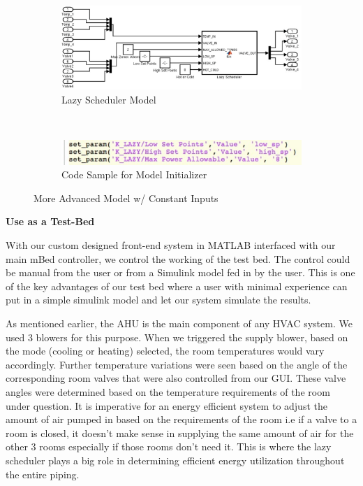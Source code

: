 \documentclass[a4paper,10pt,twocolumn]{article}
\begin{document}
\begin{figure}\centering
        \begin{subfigure}[t]{\linewidth}
                \centering
                \includegraphics[width=\linewidth]{lazy_mdl}
                \caption{Lazy Scheduler Model}
                \label{lazy_mdl}
        \end{subfigure}
	\\
        \begin{subfigure}[b]{\linewidth}
                \centering
                \includegraphics[width=\linewidth]{lazy_code}
                \caption{Code Sample for Model Initializer}
                \label{lazy_code}
        \end{subfigure}
        \caption{More Advanced Model w/ Constant Inputs}\label{lazy}
\end{figure}

\begin{center}
{\bf Use as a Test-Bed}
\end{center}

With our custom designed front-end system in MATLAB interfaced with our main mBed controller, we control the working of the test bed. The control could be manual from the user or from a Simulink model fed in by the user. This is one of the key advantages of our test bed where a user with minimal experience can put in a simple simulink model and let our system simulate the results.

As mentioned earlier, the AHU is the main component of any HVAC system. We used 3 blowers for this purpose. When we triggered the supply blower, based on the mode (cooling or heating) selected, the room temperatures would vary accordingly. Further temperature variations were seen based on the angle of the corresponding room valves that were also controlled from our GUI. These valve angles were determined based on the temperature requirements of the room under question. It is imperative for an energy efficient system to adjust the amount of air pumped in based on the requirements of the room i.e if a valve to a room is closed, it doesn’t make sense in supplying the same amount of air for the other 3 rooms especially if those rooms don’t need it. This is where the lazy scheduler plays a big role in determining efficient energy utilization throughout the entire piping.  
\end{document}
